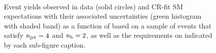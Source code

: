 \begin{figure}[h!]
\begin{center}
    \\
    \caption{Event yields observed in data (solid circles) and CR-fit SM expectations with their associated uncertainties (green histogram with shaded band) as a function of \HTmiss based on a sample of events that satisfy $n_{\text{jet}} = 4$ and $n_{\text{b}} = 2$, as well as the requirements on \scalht indicated by each sub-figure caption. }
    \label{fig:mhtval_eq4j_eq2b}
  \end{center}
\end{figure}

